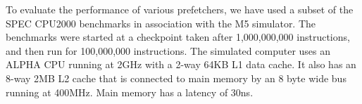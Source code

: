 To evaluate the performance of various prefetchers, we have used
a subset of the SPEC CPU2000 benchmarks in association with the M5
simulator. The benchmarks were started at a checkpoint taken after
1,000,000,000 instructions, and then run for 100,000,000 instructions.
The simulated computer uses an ALPHA CPU running at 2GHz
with a 2-way 64KB L1 data cache. It also has an 8-way 2MB L2 cache that is
connected to main memory by an 8 byte wide bus running at
400MHz. Main memory has a latency of 30ns.
